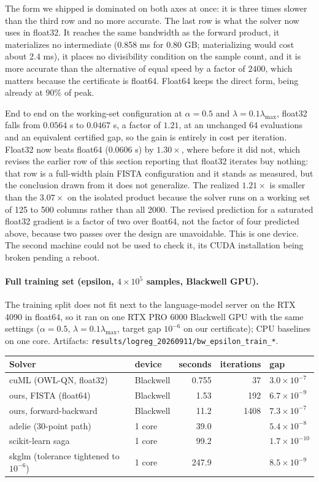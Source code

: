 The form we shipped is dominated on both axes at once: it is three times slower
than the third row and no more accurate. The last row is what the solver now
uses in float32. It reaches the same bandwidth as the forward product, it
materializes no intermediate (0.858 ms for 0.80 GB; materializing would cost
about 2.4 ms), it places no divisibility condition on the sample count, and it
is more accurate than the alternative of equal speed by a factor of $2400$,
which matters because the certificate is float64. Float64 keeps the direct form,
being already at $90\%$ of peak.

End to end on the working-set configuration at $\alpha=0.5$ and
$\lambda=0.1\lambda_{\max}$, float32 falls from $0.0564$ s to $0.0467$ s, a
factor of $1.21$, at an unchanged 64 evaluations and an equivalent certified
gap, so the gain is entirely in cost per iteration. Float32 now beats float64
($0.0606$ s) by $1.30\times$, where before it did not, which revises the earlier
row of this section reporting that float32 iterates buy nothing: that row is a
full-width plain FISTA configuration and it stands as measured, but the
conclusion drawn from it does not generalize. The realized $1.21\times$ is
smaller than the $3.07\times$ on the isolated product because the solver runs on
a working set of 125 to 500 columns rather than all 2000. The revised prediction
for a saturated float32 gradient is a factor of two over float64, not the factor
of four predicted above, because two passes over the design are unavoidable.
This is one device. The second machine could not be used to check it, its CUDA
installation being broken pending a reboot.

\paragraph{Full training set (epsilon, $4\times10^5$ samples, Blackwell GPU).}
The training split does not fit next to the language-model server on the
RTX 4090 in float64, so it ran on one RTX PRO 6000 Blackwell GPU with the same
settings ($\alpha=0.5$, $\lambda=0.1\lambda_{\max}$, target gap $10^{-6}$ on our
certificate); CPU baselines on one core. Artifacts:
\texttt{results/logreg\_20260911/bw\_epsilon\_train\_*}.

\begin{center}
\small
\begin{tabular}{llrrl}
\toprule
Solver & device & seconds & iterations & gap \\
\midrule
cuML (OWL-QN, float32) & Blackwell & 0.755 & 37 & $3.0\times10^{-7}$ \\
ours, FISTA (float64) & Blackwell & 1.53 & 192 & $6.7\times10^{-9}$ \\
ours, forward-backward & Blackwell & 11.2 & 1408 & $7.3\times10^{-7}$ \\
adelie (30-point path) & 1 core & 39.0 & & $5.4\times10^{-8}$ \\
scikit-learn saga & 1 core & 99.2 & & $1.7\times10^{-10}$ \\
skglm (tolerance tightened to $10^{-6}$) & 1 core & 247.9 & & $8.5\times10^{-9}$ \\
\bottomrule
\end{tabular}
\end{center}

